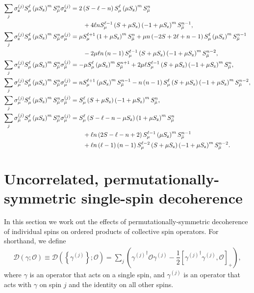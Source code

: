 \documentclass[aps,notitlepage,nofootinbib,11pt]{revtex4-1}
\newcommand{\f}[2]{\dfrac{#1}{#2}} %
\newcommand{\p}[1]{\left(#1\right)} %
\renewcommand{\sp}[1]{\left[#1\right]} %
\renewcommand{\set}[1]{\left\{#1\right\}} %
\newcommand{\D}{\mathcal{D}}
\renewcommand{\O}{\mathcal{O}}
\newcommand{\z}{\text{z}}
\newcommand{\bmu}{{\bar\mu}}
\newcommand{\1}{\mathds{1}}
\begin{document}
\begin{align}
  \sum_j \sigma_\z^{(j)} S_\mu^\ell
  \p{\mu S_\z}^m S_\bmu^n \sigma_\z^{(j)}
  &= 2\p{S-\ell-n} S_\mu^\ell \p{\mu S_\z}^m S_\bmu^n \notag \\
  &\qquad + 4\ell n S_\mu^{\ell-1} \p{S+\mu S_\z}
  \p{-1+\mu S_\z}^m S_\bmu^{n-1},
  \label{eq:san_z_z} \allowdisplaybreaks \\
  \sum_j \sigma_\z^{(j)} S_\mu^\ell
  \p{\mu S_\z}^m S_\bmu^n \sigma_\mu^{(j)}
  &= \mu S_\mu^{\ell+1} \p{1+\mu S_\z}^m S_\bmu^n
  + \mu n \p{-2S+2\ell+n-1} S_\mu^\ell
  \p{\mu S_\z}^m S_\bmu^{n-1} \notag \\
  &\qquad - 2\mu\ell n\p{n-1} S_\mu^{\ell-1}
  \p{S+\mu S_\z} \p{-1+\mu S_\z}^m S_\bmu^{n-2},
  \label{eq:san_z_mu} \allowdisplaybreaks \\
  \sum_j \sigma_\z^{(j)} S_\mu^\ell
  \p{\mu S_\z}^m S_\bmu^n \sigma_\bmu^{(j)}
  &= -\mu S_\mu^\ell \p{\mu S_\z}^m S_\bmu^{n+1}
  + 2\mu \ell S_\mu^{\ell-1} \p{S+\mu S_\z} \p{-1+\mu S_\z}^m S_\bmu^n,
  \label{eq:san_z_bmu} \allowdisplaybreaks \\
  \sum_j \sigma_\mu^{(j)} S_\mu^\ell
  \p{\mu S_\z}^m S_\bmu^n \sigma_\mu^{(j)}
  &= n S_\mu^{\ell+1} \p{\mu S_\z}^m S_\bmu^{n-1}
  - n\p{n-1} S_\mu^\ell \p{S+\mu S_\z} \p{-1+\mu S_\z}^m S_\bmu^{n-2},
  \label{eq:san_mu_mu} \allowdisplaybreaks \\
  \sum_j \sigma_\mu^{(j)} S_\mu^\ell
  \p{\mu S_\z}^m S_\bmu^n \sigma_\bmu^{(j)}
  &= S_\mu^\ell \p{S+\mu S_\z}\p{-1+\mu S_\z}^m S_\bmu^n,
  \label{eq:san_mu_bmu} \allowdisplaybreaks \\
  \sum_j \sigma_\bmu^{(j)} S_\mu^\ell
  \p{\mu S_\z}^m S_\bmu^n \sigma_\mu^{(j)}
  &= S_\mu^\ell \p{S - \ell - n - \mu S_\z}
  \p{1+\mu S_\z}^m S_\bmu^n \notag \\
  &\qquad + \ell n \p{2S - \ell - n + 2}
  S_\mu^{\ell-1} \p{\mu S_\z}^m S_\bmu^{n-1} \notag \\
  &\qquad + \ell n \p{\ell-1} \p{n-1} S_\mu^{\ell-2} \p{S+\mu S_\z}
  \p{-1+\mu S_\z}^m S_\bmu^{n-2}.
  \label{eq:san_bmu_mu}
\end{align}


\section{Uncorrelated, permutationally-symmetric single-spin
  decoherence}
\label{sec:decoherence_single}

In this section we work out the effects of permutationally-symmetric
decoherence of individual spins on ordered products of collective spin
operators.  For shorthand, we define
\begin{align}
  \D\p{\gamma;\O} \equiv \D\p{\set{\gamma^{(j)}};\O}
  = \sum_j\p{{\gamma^{(j)}}^\dag \O \gamma^{(j)}
    - \f12\sp{{\gamma^{(j)}}^\dag \gamma^{(j)}, \O}_+},
\end{align}
where $\gamma$ is an operator that acts on a single spin, and
$\gamma^{(j)}$ is an operator that acts with $\gamma$ on spin $j$ and
the identity on all other spins.
\end{document}
